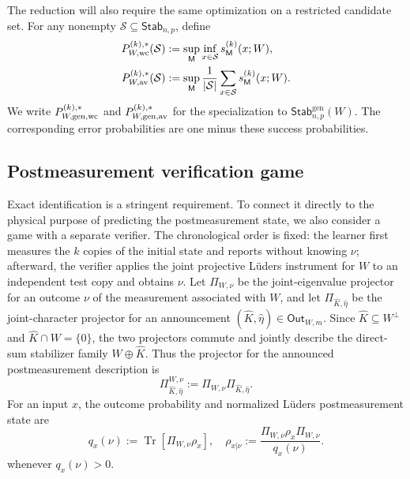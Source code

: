 \documentclass[11pt]{article}
\newcommand{\Tr}{\operatorname{Tr}}
\newcommand{\1}{\mathbf 1}
\theoremstyle{plain}
\theoremstyle{definition}
\theoremstyle{remark}
\begin{document}
The reduction will also require the same optimization on a restricted
candidate set.  For any nonempty
$\mathcal S\subseteq\mathsf{Stab}_{n,p}$, define
\begin{align}
 P_{W,\rm wc}^{(k),*}(\mathcal S)
 &:=\sup_{\mathsf M}\inf_{x\in\mathcal S}s_{\mathsf M}^{(k)}(x;W),
 \label{eq:fixed-W-restricted-wc}\\
 P_{W,\rm av}^{(k),*}(\mathcal S)
 &:=\sup_{\mathsf M}\frac1{|\mathcal S|}
 \sum_{x\in\mathcal S}s_{\mathsf M}^{(k)}(x;W).
 \label{eq:fixed-W-restricted-av}
\end{align}
We write $P_{W,\rm gen,wc}^{(k),*}$ and
$P_{W,\rm gen,av}^{(k),*}$ for the specialization to
$\mathsf{Stab}_{n,p}^{\mathrm{gen}}(W)$.  The corresponding error probabilities
are one minus these success probabilities.

\subsection{Postmeasurement verification game}
\label{subsec:fixed-W-verification-game}

Exact identification is a stringent requirement.  To connect it directly to
the physical purpose of predicting the postmeasurement state, we also consider
a game with a separate verifier.  The chronological order is fixed: the
learner first measures the $k$ copies of the initial state and reports without
knowing $\nu$; afterward, the verifier applies the joint projective L\"uders
instrument for $W$ to an independent test copy and obtains $\nu$.  Let
$\Pi_{W,\nu}$ be the joint-eigenvalue
projector for an outcome $\nu$ of the measurement associated with $W$, and
let $\Pi_{\widehat K,\widehat\eta}$ be the joint-character projector for an
announcement $(\widehat K,\widehat\eta)\in\mathsf{Out}_{W,m}$.  Since
$\widehat K\subseteq W^\perp$ and $\widehat K\cap W=\{0\}$, the two projectors
commute and jointly describe the direct-sum stabilizer family
$W\oplus\widehat K$.  Thus the projector for the announced postmeasurement
description is
\begin{equation}
 \Pi_{\widehat K,\widehat\eta}^{W,\nu}
 :=\Pi_{W,\nu}\Pi_{\widehat K,\widehat\eta}.
 \label{eq:fixed-W-announced-projector-factorization}
\end{equation}
For an input $x$, the outcome probability and normalized L\"uders
postmeasurement state are
\begin{equation}
 q_x(\nu):=\Tr[\Pi_{W,\nu}\rho_x],\quad
 \rho_{x|\nu}:=
 \frac{\Pi_{W,\nu}\rho_x\Pi_{W,\nu}}{q_x(\nu)}.
 \label{eq:fixed-W-outcome-probability}
\end{equation}
whenever $q_x(\nu)>0$.
\end{document}

